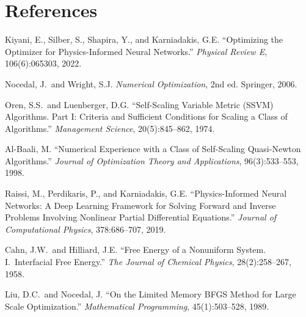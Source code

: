\documentclass[11pt,a4paper]{article}
\begin{document}
\newpage
\section*{References}

\begin{enumerate}[label={[\arabic*]},leftmargin=*,nosep]
  \item Kiyani, E., Silber, S., Shapira, Y., and Karniadakis, G.E.
        ``Optimizing the Optimizer for Physics-Informed Neural Networks.''
        \textit{Physical Review E}, 106(6):065303, 2022.

  \item Nocedal, J.\ and Wright, S.J.
        \textit{Numerical Optimization}, 2nd ed.
        Springer, 2006.

  \item Oren, S.S.\ and Luenberger, D.G.
        ``Self-Scaling Variable Metric (SSVM) Algorithms. Part I: Criteria
        and Sufficient Conditions for Scaling a Class of Algorithms.''
        \textit{Management Science}, 20(5):845--862, 1974.

  \item Al-Baali, M.
        ``Numerical Experience with a Class of Self-Scaling Quasi-Newton
        Algorithms.''
        \textit{Journal of Optimization Theory and Applications},
        96(3):533--553, 1998.

  \item Raissi, M., Perdikaris, P., and Karniadakis, G.E.
        ``Physics-Informed Neural Networks: A Deep Learning Framework for
        Solving Forward and Inverse Problems Involving Nonlinear Partial
        Differential Equations.''
        \textit{Journal of Computational Physics}, 378:686--707, 2019.

  \item Cahn, J.W.\ and Hilliard, J.E.
        ``Free Energy of a Nonuniform System. I.\ Interfacial Free Energy.''
        \textit{The Journal of Chemical Physics}, 28(2):258--267, 1958.

  \item Liu, D.C.\ and Nocedal, J.
        ``On the Limited Memory BFGS Method for Large Scale Optimization.''
        \textit{Mathematical Programming}, 45(1):503--528, 1989.
\end{enumerate}
\end{document}
